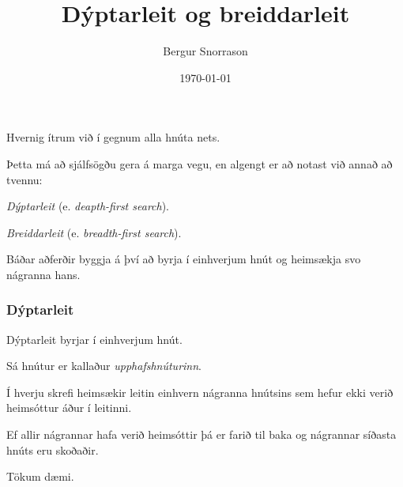 \title{Dýptarleit og breiddarleit}
\author{Bergur Snorrason}
\date{\today}



\frame{\titlepage}

{
	{
		\item<1-> Hvernig ítrum við í gegnum alla hnúta nets.
		\item<2-> Þetta má að sjálfsögðu gera á marga vegu, en algengt er að notast við annað að tvennu:
		{
			\item<3-> \emph{Dýptarleit} (e. \emph{deapth-first search}).
			\item<4-> \emph{Breiddarleit} (e. \emph{breadth-first search}).
		}
		\item<5-> Báðar aðferðir byggja á því að byrja í einhverjum hnút og heimsækja svo nágranna hans.
	}
}

{
	\frametitle{Dýptarleit}
	{
		\item<1-> Dýptarleit byrjar í einhverjum hnút.
		\item<2-> Sá hnútur er kallaður \emph{upphafshnúturinn}.
		\item<3-> Í hverju skrefi heimsækir leitin einhvern nágranna hnútsins sem hefur ekki verið heimsóttur áður í leitinni.
		\item<4-> Ef allir nágrannar hafa verið heimsóttir þá er farið til baka og nágrannar síðasta hnúts eru skoðaðir.
		\item<5-> Tökum dæmi.
	}
}


